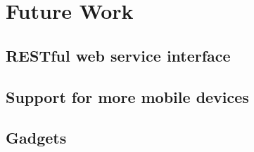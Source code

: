 
\chapter{Future Work}
\label{sec:Future Work}

\section{RESTful web service interface}

\section{Support for more mobile devices}

\section{Gadgets}


